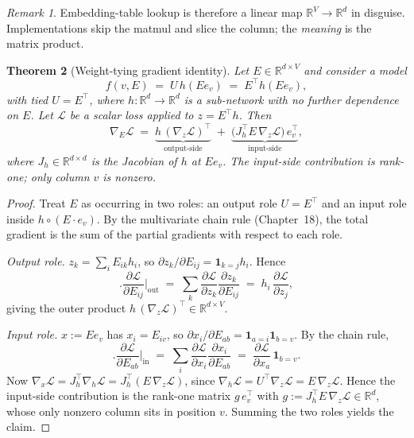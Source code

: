 \documentclass[11pt]{article}
\newtheorem{theorem}{Theorem}[section]
\theoremstyle{remark}
\newtheorem{remark}[theorem]{Remark}
\begin{document}
\begin{remark}
Embedding-table lookup is therefore a linear map $\mathbb{R}^V\to\mathbb{R}^d$ in disguise. Implementations skip the matmul and slice the column; the \emph{meaning} is the matrix product.
\end{remark}

\begin{theorem}[Weight-tying gradient identity]\label{thm:tied}
Let $E\in\mathbb{R}^{d\times V}$ and consider a model
\[
f(v,E) \;=\; U\,h(E e_v) \;=\; E^\top h(E e_v),
\]
with tied $U=E^\top$, where $h\colon\mathbb{R}^d\to\mathbb{R}^d$ is a sub-network with no further dependence on $E$. Let $\mathcal{L}$ be a scalar loss applied to $z=E^\top h$. Then
\[
\nabla_E\mathcal{L} \;=\; \underbrace{h\,(\nabla_z\mathcal{L})^\top}_{\text{output-side}} \;+\; \underbrace{\big(J_h^\top E\,\nabla_z\mathcal{L}\big)\,e_v^\top}_{\text{input-side}},
\]
where $J_h\in\mathbb{R}^{d\times d}$ is the Jacobian of $h$ at $E e_v$. The input-side contribution is rank-one; only column $v$ is nonzero.
\end{theorem}

\begin{proof}
Treat $E$ as occurring in two roles: an output role $U=E^\top$ and an input role inside $h\circ(E\cdot e_v)$. By the multivariate chain rule (Chapter~18), the total gradient is the sum of the partial gradients with respect to each role.

\emph{Output role.} $z_k=\sum_i E_{ik}h_i$, so $\partial z_k/\partial E_{ij}=\mathbf{1}_{k=j}h_i$. Hence
\[
\Big.\frac{\partial\mathcal{L}}{\partial E_{ij}}\Big|_{\text{out}} \;=\; \sum_k \frac{\partial\mathcal{L}}{\partial z_k}\frac{\partial z_k}{\partial E_{ij}} \;=\; h_i\,\frac{\partial\mathcal{L}}{\partial z_j},
\]
giving the outer product $h\,(\nabla_z\mathcal{L})^\top\in\mathbb{R}^{d\times V}$.

\emph{Input role.} $x:=E e_v$ has $x_i=E_{iv}$, so $\partial x_i/\partial E_{ab}=\mathbf{1}_{a=i}\mathbf{1}_{b=v}$. By the chain rule,
\[
\Big.\frac{\partial\mathcal{L}}{\partial E_{ab}}\Big|_{\text{in}} \;=\; \sum_i \frac{\partial\mathcal{L}}{\partial x_i}\frac{\partial x_i}{\partial E_{ab}} \;=\; \frac{\partial\mathcal{L}}{\partial x_a}\,\mathbf{1}_{b=v}.
\]
Now $\nabla_x\mathcal{L} = J_h^\top\nabla_h\mathcal{L} = J_h^\top(E\,\nabla_z\mathcal{L})$, since $\nabla_h\mathcal{L}=U^\top\nabla_z\mathcal{L}=E\,\nabla_z\mathcal{L}$. Hence the input-side contribution is the rank-one matrix $g\,e_v^\top$ with $g:=J_h^\top E\,\nabla_z\mathcal{L}\in\mathbb{R}^d$, whose only nonzero column sits in position $v$. Summing the two roles yields the claim.
\end{proof}
\end{document}

